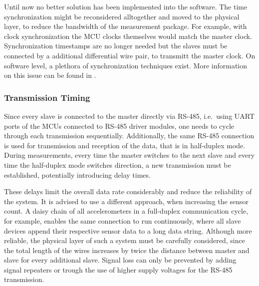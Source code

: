 Until now no better solution has been implemented into the software. The time synchronization might be reconsidered alltogether and moved to the physical layer, to reduce the bandwidth of the measurement package. For example, with clock synchronization the \ac{MCU} clocks themselves would match the master clock. Synchronization timestamps are no longer needed but the slaves must be connected by a additional differential wire pair, to transmitt the master clock. On software level, a plethora of synchronization techniques exist. More information on this issue can be found in \cite{sriram2018embedded}.

\subsubsection{Transmission Timing}
Since every slave is connected to the master directly via \ac{RS}-485, i.e.\ using \ac{UART} ports of the \ac{MCU}s connected to \ac{RS}-485 driver modules, one needs to cycle through each transmission sequentially. Additionally, the same \ac{RS}-485 connection is used for transmission and reception of the data, that is in half-duplex mode. During measurements, every time the master switches to the next slave and every time the half-duplex mode switches direction, a new transmission must be established, potentially introducing delay times.

These delays limit the overall data rate considerably and reduce the reliability of the system. It is advised to use a different approach, when increasing the sensor count. A daisy chain of all accelerometers in a full-duplex communication cycle, for example, enables the same connection to run continuously, where all slave devices append their respective sensor data to a long data string. Although more reliable, the physical layer of such a system must be carefully considered, since the total length of the wires increases by twice the distance between master and slave for every additional slave. Signal loss can only be prevented by adding signal repeaters or trough the use of higher supply voltages for the \ac{RS}-485 transmission.
